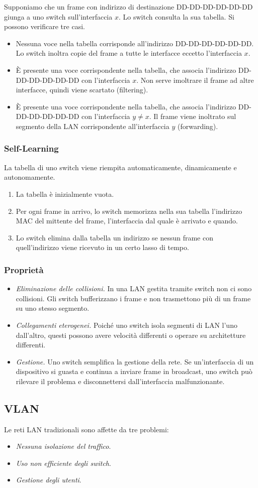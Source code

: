 \documentclass[11pt]{book}
\begin{document}
Supponiamo che un frame con indirizzo di destinazione DD-DD-DD-DD-DD-DD giunga a uno switch sull'interfaccia $x$. Lo switch 
consulta la sua tabella. Si possono verificare tre casi.
\begin{itemize}
    \item Nessuna voce nella tabella corrisponde all'indirizzo DD-DD-DD-DD-DD-DD. Lo switch inoltra copie del frame a tutte 
    le interfacce eccetto l'interfaccia $x$.
    \item È presente una voce corrispondente nella tabella, che associa l'indirizzo DD-DD-DD-DD-DD-DD con l'interfaccia 
    $x$. Non serve imoltrare il frame ad altre interfacce, quindi viene scartato (filtering).
    \item È presente una voce corrispondente nella tabella, che associa l'indirizzo DD-DD-DD-DD-DD-DD con l'interfaccia 
    $y\neq x$. Il frame viene inoltrato sul segmento della LAN corrispondente all'interfaccia $y$ (forwarding).
\end{itemize}
\subsubsection{Self-Learning}
La tabella di uno switch viene riempita automaticamente, dinamicamente e autonomamente.
\begin{enumerate}
    \item La tabella è inizialmente vuota.
    \item Per ogni frame in arrivo, lo switch memorizza nella sua tabella l'indirizzo MAC del mittente del frame, l'interfaccia 
    dal quale è arrivato e quando. 
    \item Lo switch elimina dalla tabella un indirizzo se nessun frame con quell'indirizzo viene ricevuto in un certo lasso 
    di tempo.
\end{enumerate}
\subsubsection{Proprietà}
\begin{itemize}
    \item \textit{Eliminazione delle collisioni.} In una LAN gestita tramite switch non ci sono collisioni. Gli switch 
    bufferizzano i frame e non trasmettono più di un frame su uno stesso segmento. 
    \item \textit{Collegamenti eterogenei.} Poiché uno switch isola segmenti di LAN l'uno dall'altro, questi possono avere 
    velocità differenti o operare su architetture differenti.
    \item \textit{Gestione.} Uno switch semplifica la gestione della rete. Se un'interfaccia di un dispositivo si guasta 
    e continua a inviare frame in broadcast, uno switch può rilevare il problema e disconnettersi dall'interfaccia malfunzionante.
\end{itemize}
\subsection{VLAN}
Le reti LAN tradizionali sono affette da tre problemi:
\begin{itemize}
    \item \textit{Nessuna isolazione del traffico}. 
    \item \textit{Uso non efficiente degli switch}.
    \item \textit{Gestione degli utenti}.
\end{itemize}
\end{document}
